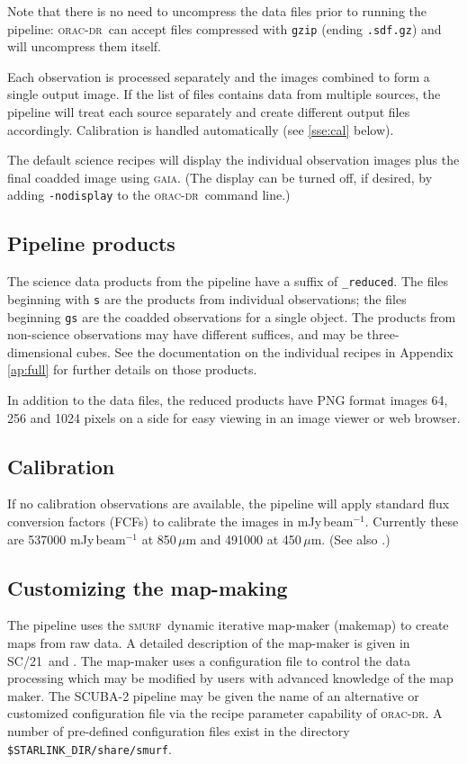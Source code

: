 \documentclass[twoside,11pt]{article}
\newcommand{\xref}[3]{#1}
\renewcommand{\_}{\texttt{\symbol{95}}}
\newcommand{\GAIA}{\textsc{gaia}}
\newcommand{\SMURF}{\textsc{smurf}}
\newcommand{\SMURFcook}{\xref{SC/21}{sc21}{}}
\newcommand{\oracdr}{\textsc{orac-dr}}
\newcommand{\task}[1]{\textsf{#1}}
\newcommand{\makemap}{\xref{\task{makemap}}{sun258}{MAKEMAP}}
\begin{document}
Note that there is no need to uncompress the data files prior to
running the pipeline: \oracdr\ can accept files compressed with
\verb+gzip+ (ending \verb+.sdf.gz+) and will uncompress them itself.

Each observation is processed separately and the images combined to
form a single output image. If the list of files contains data from
multiple sources, the pipeline will treat each source separately and
create different output files accordingly. Calibration is handled
automatically (see \ref{sse:cal} below).

The default science recipes will display the individual observation
images plus the final coadded image using \GAIA. (The display can be
turned off, if desired, by adding \texttt{-nodisplay} to the
\oracdr\ command line.)

\subsection{Pipeline products}

The science data products from the pipeline have a suffix of
\verb+_reduced+. The files beginning with \verb+s+ are the products
from individual observations; the files beginning \verb+gs+ are the
coadded observations for a single object. The products from
non-science observations may have different suffices, and may be
three-dimensional cubes. See the documentation on the individual
recipes in Appendix\,\ref{ap:full} for further details on those
products.

In addition to the data files, the reduced products have PNG format
images 64, 256 and 1024 pixels on a side for easy viewing in an image
viewer or web browser.

\subsection{Calibration\label{sse:cal}}

If no calibration observations are available, the pipeline will apply
standard flux conversion factors (FCFs) to calibrate the images in
mJy\,beam$^{-1}$. Currently these are 537000 mJy\,beam$^{-1}$ at
850\,$\mu$m and 491000 at 450\,$\mu$m. (See also
\cite{scuba2calpaper}.)

\subsection{Customizing the map-making}

The pipeline uses the \SMURF\ dynamic iterative map-maker (\makemap)
to create maps from raw data. A detailed description of the map-maker
is given in \SMURFcook\ and \cite{smurfpaper}. The map-maker uses a
configuration file to control the data processing which may be
modified by users with advanced knowledge of the map maker. The
SCUBA-2 pipeline may be given the name of an alternative or customized
configuration file via the recipe parameter capability of \oracdr. A
number of pre-defined configuration files exist in the directory
\verb+$STARLINK_DIR/share/smurf+.
\end{document}
